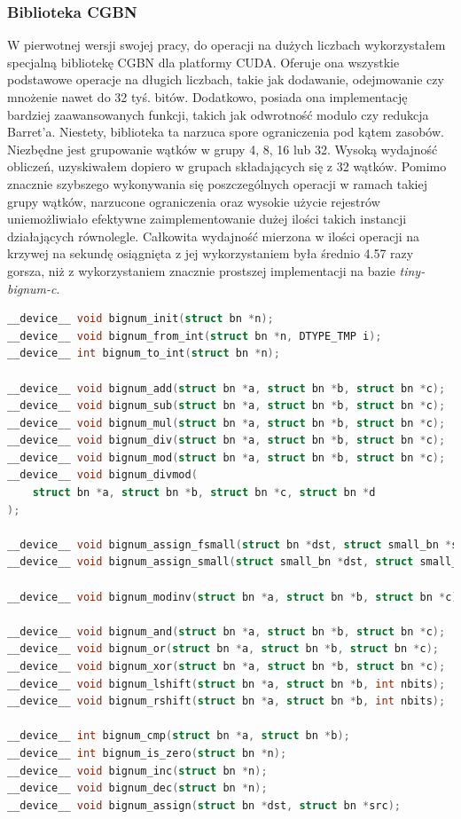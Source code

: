 \subsubsection{Biblioteka CGBN}
W pierwotnej wersji swojej pracy, do operacji na dużych liczbach wykorzystałem specjalną bibliotekę CGBN dla platformy CUDA. Oferuje ona
wszystkie podstawowe operacje na długich liczbach, takie jak dodawanie, odejmowanie czy mnożenie nawet do 32 tyś. bitów.
Dodatkowo, posiada ona implementację bardziej zaawansowanych funkcji, takich jak odwrotność modulo czy redukcja Barret'a.
Niestety, biblioteka ta narzuca spore ograniczenia pod kątem zasobów. Niezbędne jest grupowanie wątków w grupy
4, 8, 16 lub 32. Wysoką wydajność obliczeń, uzyskiwałem dopiero w grupach składających się z 32 wątków.
Pomimo znacznie szybszego wykonywania się poszczególnych operacji w ramach takiej grupy wątków, narzucone
ograniczenia oraz wysokie użycie rejestrów uniemożliwiało
efektywne zaimplementowanie dużej ilości takich instancji działających równolegle.
Całkowita wydajność mierzona w ilości operacji na krzywej na sekundę osiągnięta z jej wykorzystaniem była średnio 4.57 razy gorsza, niż
z wykorzystaniem znacznie prostszej implementacji na bazie \textit{tiny-bignum-c}.

\begin{lstlisting}[language=C, caption=Prototypy funkcji wykorzystywanych do operacji na długich liczbach]
__device__ void bignum_init(struct bn *n);
__device__ void bignum_from_int(struct bn *n, DTYPE_TMP i);
__device__ int bignum_to_int(struct bn *n);

__device__ void bignum_add(struct bn *a, struct bn *b, struct bn *c);
__device__ void bignum_sub(struct bn *a, struct bn *b, struct bn *c);
__device__ void bignum_mul(struct bn *a, struct bn *b, struct bn *c);
__device__ void bignum_div(struct bn *a, struct bn *b, struct bn *c);
__device__ void bignum_mod(struct bn *a, struct bn *b, struct bn *c);
__device__ void bignum_divmod(
    struct bn *a, struct bn *b, struct bn *c, struct bn *d
);

__device__ void bignum_assign_fsmall(struct bn *dst, struct small_bn *src);
__device__ void bignum_assign_small(struct small_bn *dst, struct small_bn *src);

__device__ void bignum_modinv(struct bn *a, struct bn *b, struct bn *c);

__device__ void bignum_and(struct bn *a, struct bn *b, struct bn *c);
__device__ void bignum_or(struct bn *a, struct bn *b, struct bn *c);
__device__ void bignum_xor(struct bn *a, struct bn *b, struct bn *c);
__device__ void bignum_lshift(struct bn *a, struct bn *b, int nbits);
__device__ void bignum_rshift(struct bn *a, struct bn *b, int nbits);

__device__ int bignum_cmp(struct bn *a, struct bn *b);
__device__ int bignum_is_zero(struct bn *n);
__device__ void bignum_inc(struct bn *n);
__device__ void bignum_dec(struct bn *n);
__device__ void bignum_assign(struct bn *dst, struct bn *src);
\end{lstlisting}

